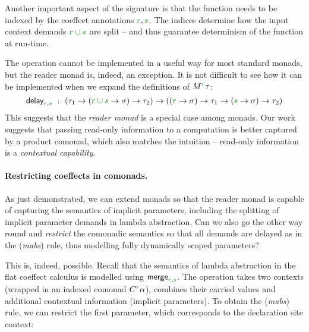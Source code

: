 Another important aspect of the signature is that the function needs to be indexed by the coeffect
annotations $\cclrd{r}, \cclrd{s}$. The indices determine how the input context demands
$\cclrd{r \cup s}$ are split -- and thus guarantee determinism of the function at run-time.

The operation cannot be implemented in a useful way for most standard monads, but the
reader monad is, indeed, an exception. It is not difficult to see how it can be implemented
when we expand the definitions of $\mtyp{\cclrd{r}}\tau$:
%
\begin{equation*}
\ident{delay}_{\cclrd{r}, \cclrd{s}}~:~
(\tau_1\rightarrow(\cclrd{r \cup s} \rightarrow \sigma) \rightarrow \tau_2) \rightarrow
((\cclrd{r} \rightarrow \sigma) \rightarrow \tau_1\rightarrow(\cclrd{s} \rightarrow \sigma) \rightarrow \tau_2)
\end{equation*}
%
This suggests that the \emph{reader monad} is a special case among monads. Our work suggests that
passing read-only information to a computation is better captured by a product comonad, which also
matches the intuition -- read-only information is a \emph{contextual capability}.

\paragraph{Restricting coeffects in comonads.}
As just demonstrated, we can extend monads so that the reader monad is capable of capturing
the semantics of implicit parameters, including the splitting of implicit parameter demands
in lambda abstraction. Can we also go the other way round and \emph{restrict} the comonadic
semantics so that all demands are delayed as in the (\emph{mabs}) rule, thus modelling
fully dynamically scoped parameters?

This is, indeed, possible. Recall that the semantics of lambda abstraction in the flat
coeffect calculus is modelled using $\ident{merge}_{\cclrd{r}, \cclrd{s}}$. The operation takes
two contexts (wrapped in an indexed comonad $\ctyp{\cclrd{r}}\alpha$), combines their carried
values and additional contextual information (implicit parameters). To obtain the (\emph{mabs})
rule, we can restrict the first parameter, which corresponds to the declaration site context:

